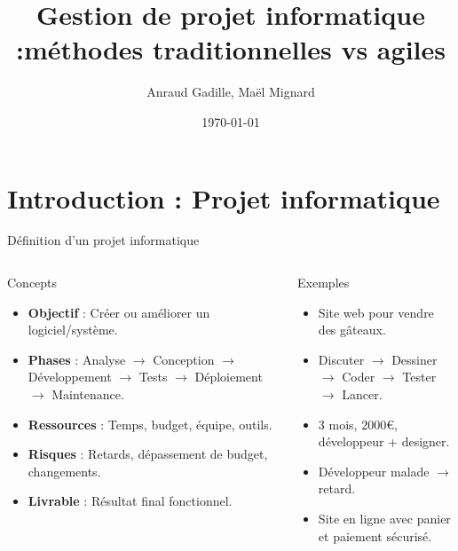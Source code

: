 \documentclass{beamer}
\title{Gestion de projet informatique :\newline méthodes traditionnelles vs agiles}
\author{Anraud Gadille, Maël Mignard}
\date{\today}
\begin{document}
\begin{frame}
  \titlepage
\end{frame}

\section{Introduction : Projet informatique}
\begin{frame}{\color{myblue}Définition d'un projet informatique}
  \scriptsize
  \begin{columns}
    {
    \begin{block}{Concepts}
      \begin{itemize}
        \item \textbf{Objectif} : Créer ou améliorer un logiciel/système.
        \item \textbf{Phases} : Analyse $\rightarrow$ Conception $\rightarrow$ Développement $\rightarrow$ Tests $\rightarrow$ Déploiement $\rightarrow$ Maintenance.
        \item \textbf{Ressources} : Temps, budget, équipe, outils.
        \item \textbf{Risques} : Retards, dépassement de budget, changements.
        \item \textbf{Livrable} : Résultat final fonctionnel.
      \end{itemize}
    \end{block}}
    {
    \begin{block}{Exemples}
      \begin{itemize}
        \item Site web pour vendre des gâteaux.
        \item Discuter $\rightarrow$ Dessiner $\rightarrow$ Coder $\rightarrow$ Tester $\rightarrow$ Lancer.
        \item 3 mois, 2000€, développeur + designer.
        \item Développeur malade $\rightarrow$ retard.
        \item Site en ligne avec panier et paiement sécurisé.
      \end{itemize}
    \end{block}}
  \end{columns}
\end{frame}
\end{document}
